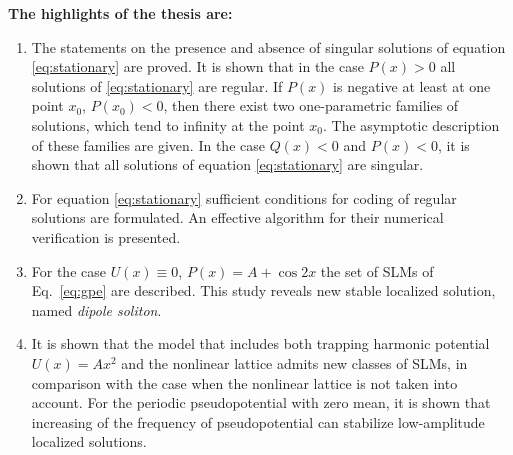 \documentclass[candidate, href, colorlinks]{disser}
\begin{document}

\textbf{The highlights of the thesis are:}
\begin{enumerate}
	\item The statements on the presence and absence of singular solutions of equation \eqref{eq:stationary} are proved.
		It is shown that in the case $P(x) > 0$ all solutions of \eqref{eq:stationary} are regular.
		If $P(x)$ is negative at least at one point $x_0$, $P(x_0) < 0$, then there exist two one-parametric families of solutions, which tend to infinity at the point $x_0$.
		The asymptotic description of these families are given.
		In the case $Q(x) < 0$ and $P(x) < 0$, it is shown that all solutions of equation \eqref{eq:stationary} are singular.
	\item For equation \eqref{eq:stationary} sufficient conditions for coding of regular solutions are formulated.
		An effective algorithm for their numerical verification is presented.
	\item For the case $U(x) \equiv 0$, $P(x) = A + \cos 2x$ the set of SLMs of Eq.~\eqref{eq:gpe} are described.
		This study reveals new stable localized solution, named {\it dipole soliton}.
	\item It is shown that the model that includes both trapping harmonic potential $U(x) = A x^2$ and the nonlinear lattice admits new classes of SLMs, in comparison with the case when the nonlinear lattice is not taken into account.
		For the periodic pseudopotential with zero mean, it is shown that increasing of the frequency of pseudopotential can stabilize low-amplitude localized solutions.
\end{enumerate}
\end{document}
